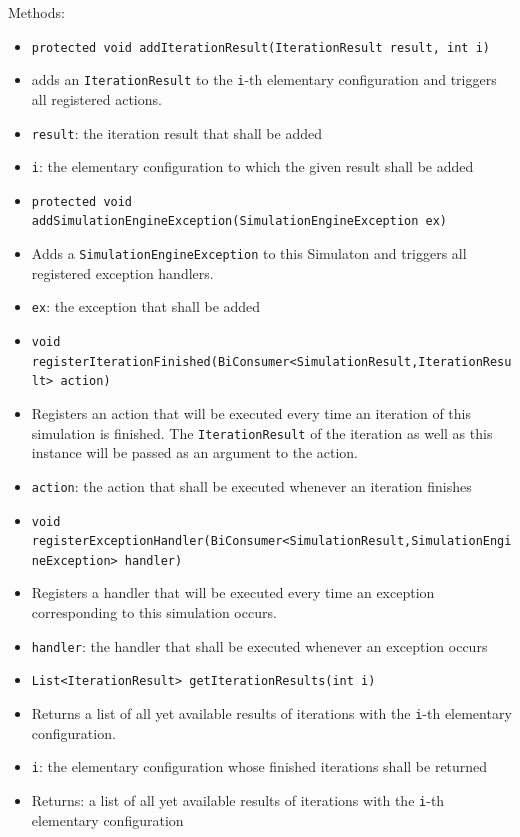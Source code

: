 \documentclass[parskip=full,11pt]{scrartcl}
\begin{document}
Methods:
\begin{itemize}\itemsep -10pt
	\item \texttt{protected void addIterationResult(IterationResult result, int i)}
	\item[] adds an \texttt{IterationResult} to the \texttt{i}-th elementary configuration and triggers all registered actions.
	\item[] \texttt{result}: the iteration result that shall be added
	\item[] \texttt{i}: the elementary configuration to which the given result shall be added

	\item \texttt{protected void addSimulationEngineException(SimulationEngineException ex)}
	\item[] Adds a \texttt{SimulationEngineException} to this Simulaton and triggers all registered exception handlers.
	\item[] \texttt{ex}: the exception that shall be added

	\item \texttt{void registerIterationFinished(BiConsumer<SimulationResult,IterationResult> action)}
	\item[] Registers an action that will be executed every time an iteration of this simulation is finished. The \texttt{IterationResult} of the iteration as well as this instance will be passed as an argument to the action.
	\item[] \texttt{action}: the action that shall be executed whenever an iteration finishes

	\item \texttt{void registerExceptionHandler(BiConsumer<SimulationResult,SimulationEngineException> handler)}
	\item[] Registers a handler that will be executed every time an exception corresponding to this simulation occurs.
	\item[] \texttt{handler}: the handler that shall be executed whenever an exception occurs

	\item \texttt{List<IterationResult> getIterationResults(int i)}
	\item[] Returns a list of all yet available results of iterations with the \texttt{i}-th elementary configuration.
	\item[] \texttt{i}: the elementary configuration whose finished iterations shall be returned
	\item[] Returns: a list of all yet available results of iterations with the \texttt{i}-th elementary configuration


\end{itemize}
\end{document}
